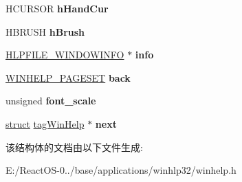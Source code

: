\begin{DoxyCompactItemize}
H\+C\+U\+R\+S\+OR {\bfseries h\+Hand\+Cur}
\item 
\mbox{\label{structtag_win_help_a5cf121dd4989b6ffbe3042226956cfc6}} 
H\+B\+R\+U\+SH {\bfseries h\+Brush}
\item 
\mbox{\label{structtag_win_help_acde425783a8451a8f86616c61c880e60}} 
\hyperlink{struct_h_l_p_f_i_l_e___w_i_n_d_o_w_i_n_f_o}{H\+L\+P\+F\+I\+L\+E\+\_\+\+W\+I\+N\+D\+O\+W\+I\+N\+FO} $\ast$ {\bfseries info}
\item 
\mbox{\label{structtag_win_help_ae7f751d964439828bcf91ada8d3e2098}} 
\hyperlink{structtag_page_set}{W\+I\+N\+H\+E\+L\+P\+\_\+\+P\+A\+G\+E\+S\+ET} {\bfseries back}
\item 
\mbox{\label{structtag_win_help_a63631efb358bfe467ed649cef460379a}} 
unsigned {\bfseries font\+\_\+scale}
\item 
\mbox{\label{structtag_win_help_aab36db0f5a3c97836e70f8ddb45b851c}} 
\hyperlink{interfacestruct}{struct} \hyperlink{structtag_win_help}{tag\+Win\+Help} $\ast$ {\bfseries next}
\end{DoxyCompactItemize}


该结构体的文档由以下文件生成\+:\begin{DoxyCompactItemize}
\item 
E\+:/\+React\+O\+S-\/0../base/applications/winhlp32/winhelp.\+h\end{DoxyCompactItemize}
